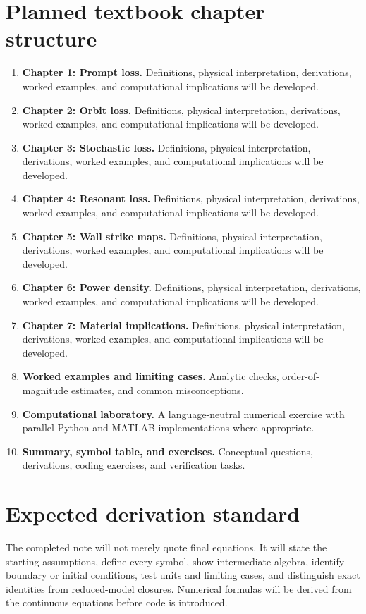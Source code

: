 \documentclass[11pt]{article}
\begin{document}
\section{Planned textbook chapter structure}
\begin{enumerate}[leftmargin=1.8em]
\item \textbf{Chapter 1: Prompt loss.} Definitions, physical interpretation, derivations, worked examples, and computational implications will be developed.
\item \textbf{Chapter 2: Orbit loss.} Definitions, physical interpretation, derivations, worked examples, and computational implications will be developed.
\item \textbf{Chapter 3: Stochastic loss.} Definitions, physical interpretation, derivations, worked examples, and computational implications will be developed.
\item \textbf{Chapter 4: Resonant loss.} Definitions, physical interpretation, derivations, worked examples, and computational implications will be developed.
\item \textbf{Chapter 5: Wall strike maps.} Definitions, physical interpretation, derivations, worked examples, and computational implications will be developed.
\item \textbf{Chapter 6: Power density.} Definitions, physical interpretation, derivations, worked examples, and computational implications will be developed.
\item \textbf{Chapter 7: Material implications.} Definitions, physical interpretation, derivations, worked examples, and computational implications will be developed.
\item \textbf{Worked examples and limiting cases.} Analytic checks, order-of-magnitude estimates, and common misconceptions.
\item \textbf{Computational laboratory.} A language-neutral numerical exercise with parallel Python and MATLAB implementations where appropriate.
\item \textbf{Summary, symbol table, and exercises.} Conceptual questions, derivations, coding exercises, and verification tasks.
\end{enumerate}

\section{Expected derivation standard}
The completed note will not merely quote final equations. It will state the starting assumptions, define every symbol, show intermediate algebra, identify boundary or initial conditions, test units and limiting cases, and distinguish exact identities from reduced-model closures. Numerical formulas will be derived from the continuous equations before code is introduced.
\end{document}
